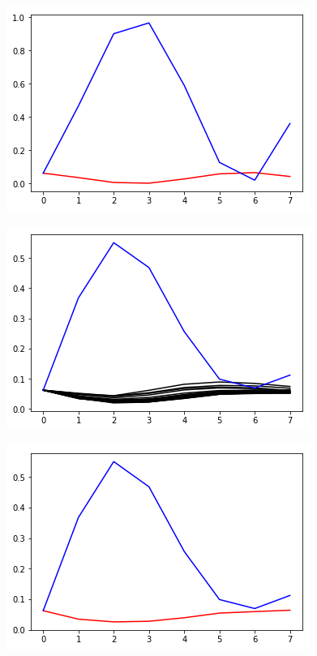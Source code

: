 \begin{figure}[H]
\centering \includegraphics[width=0.9\linewidth]{img/groverpairlossless.png}
\caption{}
\end{figure}

\begin{figure}[H]
\centering \includegraphics[width=0.9\linewidth]{img/groverall5e-6loss.png}
\caption{}
\end{figure}

\begin{figure}[H]
\centering \includegraphics[width=0.9\linewidth]{img/groverpair5e-6loss.png}
\caption{}
\end{figure}


